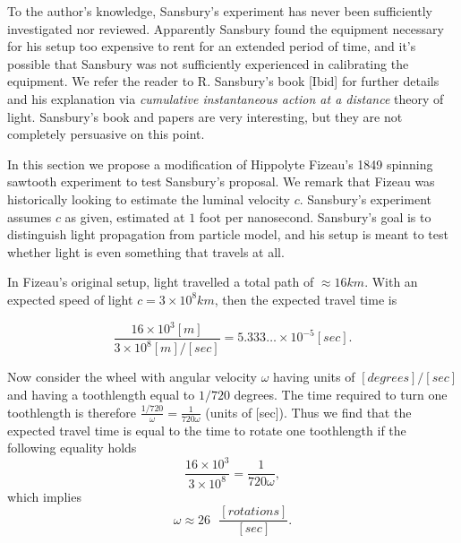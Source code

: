 \documentclass[12pt]{amsart}
\begin{document}

To the author's knowledge, Sansbury's experiment has never been sufficiently investigated nor reviewed. Apparently Sansbury found the equipment necessary for his setup too expensive to rent for an extended period of time, and it's possible that Sansbury was not sufficiently experienced in calibrating the equipment. We refer the reader to R. Sansbury's book [Ibid] for further details and his explanation via \emph{cumulative instantaneous action at a distance} theory of light. Sansbury's book and papers are very interesting, but they are not completely persuasive on this point.

In this section we propose a modification of Hippolyte Fizeau's 1849 spinning sawtooth experiment to test Sansbury's proposal. We remark that Fizeau was historically looking to estimate the luminal velocity $c$. Sansbury's experiment assumes $c$ as given, estimated at $1$ foot per nanosecond. Sansbury's goal is to distinguish light propagation from particle model, and his setup is meant to test whether light is even something that travels at all. 

In Fizeau's original setup, light travelled a total path of $\approx 16 km$. With an expected speed of light $c=3\times 10^8 km$, then the expected travel time is 

\begin{equation}
\frac{16 \times 10^3 [m]}{3 \times 10^8 [m]/[sec]}=5.333\ldots \times 10^{-5} [sec].\end{equation} 

Now consider the wheel with angular velocity $\omega$ having units of $[degrees]/[sec]$ and having a toothlength equal to $1/720$ degrees. The time required to turn one toothlength is therefore $\frac{1/720}{\omega}=\frac{1}{720 \omega}$ (units of [sec]). Thus we find that the expected travel time is equal to the time to rotate one toothlength if the following equality holds $$\frac{16 \times 10^3 }{3 \times 10^8} = \frac{1}{720 \omega}, $$ which implies $$\omega \approx 26 ~~~\frac{[rotations]}{[sec]}.$$
\end{document}
